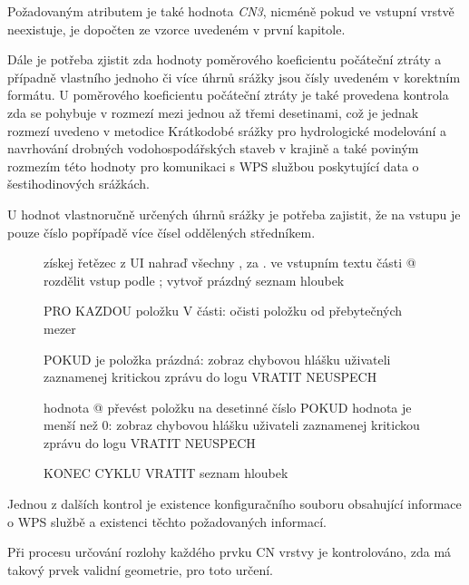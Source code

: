 \documentclass[a4paper,oneside,12pt]{book}
\begin{document}
\hspace{10mm} Požadovaným atributem je také hodnota \textit{CN3}, nicméně pokud ve vstupní vrstvě neexistuje, je dopočten ze vzorce uvedeném v první kapitole.

\hspace{10mm} Dále je potřeba zjistit zda hodnoty poměrového koeficientu počáteční ztráty a případně vlastního jednoho či více úhrnů srážky jsou čísly uvedeném v korektním formátu. U poměrového koeficientu počáteční ztráty je také provedena kontrola zda se pohybuje v rozmezí mezi jednou až třemi desetinami, což je jednak rozmezí uvedeno v metodice Krátkodobé srážky pro hydrologické modelování a navrhování drobných vodohospodářských staveb v krajině \cite{MNYDGwleJOjKLRU2} a také poviným rozmezím této hodnoty pro komunikaci s WPS službou poskytující data o šestihodinových srážkách.

\hspace{10mm} U hodnot vlastnoručně určených úhrnů srážky je potřeba zajistit, že na vstupu je pouze číslo popřípadě více čísel oddělených středníkem.
\begin{figure}[H] 
\begin{pseudocode}[style=mypseudocode, caption={Ukázka kontroly uživatelského vstupu výšky úhrnu srážky},label={kod:runoff_check}]
 získej řetězec z UI
 nahraď všechny , za . ve vstupním textu
 části @ rozdělit vstup podle ;
 vytvoř prázdný seznam hloubek
 
 PRO KAZDOU položku V části:
    očisti položku od přebytečných mezer
    
    POKUD je položka prázdná:
        zobraz chybovou hlášku uživateli
        zaznamenej kritickou zprávu do logu
        VRATIT NEUSPECH

    hodnota @ převést položku na desetinné číslo
    POKUD hodnota je menší než 0:
        zobraz chybovou hlášku uživateli
        zaznamenej kritickou zprávu do logu
        VRATIT NEUSPECH

KONEC CYKLU
VRATIT seznam hloubek

\end{pseudocode}
\end{figure}

\hspace{10mm} Jednou z dalších kontrol je existence konfiguračního souboru obsahující informace o WPS službě a existenci těchto požadovaných informací.

\hspace{10mm} Při procesu určování rozlohy každého prvku CN vrstvy je kontrolováno, zda má takový prvek validní geometrie, pro toto určení.
\end{document}
